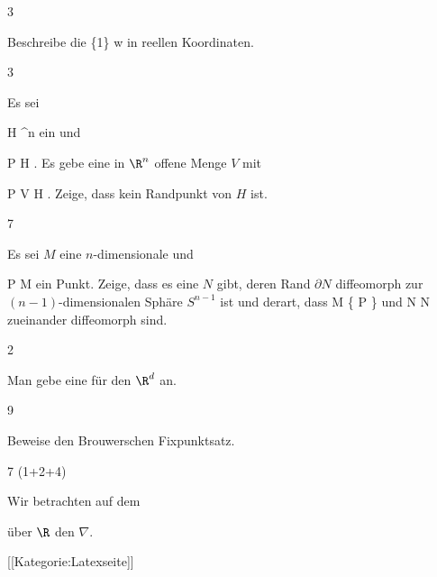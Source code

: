 {3}
{

Beschreibe die
\maabbeledisp {\psi} { \Complex \setminus \{1\} } { \Complex
} {w} { {  }
} {}
in reellen Koordinaten.

}
{} {}

{3}
{

Es sei

\mavergleichskette
{\vergleichskette
{ H
}
{ \subseteq }{ \R^n
}
{  }{
}
{    }{
}
{   }{
}
}
{}{}{}
ein
und

\mavergleichskette
{\vergleichskette
{ P
}
{ \in }{ H
}
{  }{
}
{    }{
}
{   }{
}
}
{}{}{.}
Es gebe eine in $\R^n$ offene Menge $V$ mit

\mavergleichskette
{\vergleichskette
{ P
}
{ \in }{ V
}
{ \subseteq }{ H
}
{    }{
}
{   }{
}
}
{}{}{.}
Zeige, dass
 kein Randpunkt von $H$ ist.

}
{} {}

{7}
{

Es sei $M$ eine $n$-dimensionale
und

\mavergleichskette
{\vergleichskette
{ P
}
{ \in }{ M
}
{  }{
}
{    }{
}
{   }{
}
}
{}{}{}
ein Punkt. Zeige, dass es eine
$N$ gibt, deren Rand $\partial N$  diffeomorph zur $(n-1)$-dimensionalen Sphäre $S^{n-1}$ ist und derart, dass
\mathkor {} {M \setminus \{ P \}} {und} {N \setminus \partial N} {}
zueinander diffeomorph sind.

}
{} {}

{2}
{

Man gebe eine
für den $\R^d$ an.

}
{} {}

{9}
{

Beweise den Brouwerschen Fixpunktsatz.

}
{} {}

{7 (1+2+4)}
{

Wir betrachten auf dem

 über $\R$ den
$\nabla$.

}
{} {}

 [[Kategorie:Latexseite]]
